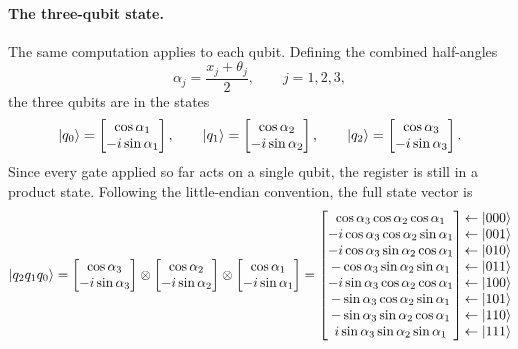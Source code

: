 \documentclass[12pt]{article}
\numberwithin{equation}{section}  %
\begin{document}
\paragraph{The three-qubit state.} The same computation applies to each qubit. Defining the combined half-angles
\begin{equation}
\alpha_j = \frac{x_j + \theta_j}{2}, \qquad j = 1, 2, 3,
\end{equation}
the three qubits are in the states
\begin{equation}
\ket{q_0} = \begin{bmatrix} \cos\alpha_1 \\ -i\sin\alpha_1 \end{bmatrix}, \qquad
\ket{q_1} = \begin{bmatrix} \cos\alpha_2 \\ -i\sin\alpha_2 \end{bmatrix}, \qquad
\ket{q_2} = \begin{bmatrix} \cos\alpha_3 \\ -i\sin\alpha_3 \end{bmatrix}.
\end{equation}
Since every gate applied so far acts on a single qubit, the register is still in a product state. Following the little-endian convention, the full state vector is
\begin{equation}
\ket{q_2 q_1 q_0}
= \begin{bmatrix} \cos\alpha_3 \\ -i\sin\alpha_3 \end{bmatrix} \otimes
\begin{bmatrix} \cos\alpha_2 \\ -i\sin\alpha_2 \end{bmatrix} \otimes
\begin{bmatrix} \cos\alpha_1 \\ -i\sin\alpha_1 \end{bmatrix}
= \begin{bmatrix}
\cos\alpha_3 \cos\alpha_2 \cos\alpha_1 \\
-i\cos\alpha_3 \cos\alpha_2 \sin\alpha_1 \\
-i\cos\alpha_3 \sin\alpha_2 \cos\alpha_1 \\
-\cos\alpha_3 \sin\alpha_2 \sin\alpha_1 \\
-i\sin\alpha_3 \cos\alpha_2 \cos\alpha_1 \\
-\sin\alpha_3 \cos\alpha_2 \sin\alpha_1 \\
-\sin\alpha_3 \sin\alpha_2 \cos\alpha_1 \\
i\sin\alpha_3 \sin\alpha_2 \sin\alpha_1
\end{bmatrix}
\begin{matrix}
\leftarrow \ket{000} \\ \leftarrow \ket{001} \\ \leftarrow \ket{010} \\ \leftarrow \ket{011} \\ \leftarrow \ket{100} \\ \leftarrow \ket{101} \\ \leftarrow \ket{110} \\ \leftarrow \ket{111}
\end{matrix}
\label{eq:statevector-hidden1}
\end{equation}
\end{document}
